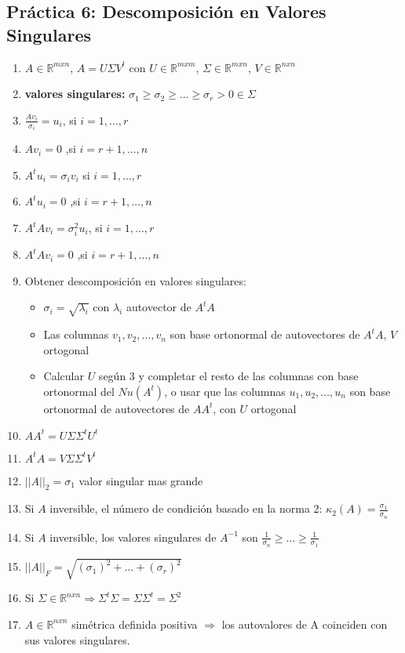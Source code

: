 \subsection*{Práctica 6: Descomposición en Valores Singulares}
\begin{enumerate}
    \item $A \in \mathbb{R}^{mxn}$, $A=U\Sigma V^t$ con  $U \in \mathbb{R}^{mxm}$, $\Sigma \in \mathbb{R}^{mxn}$, $V\in \mathbb{R}^{nxn}$
    \item \textbf{valores singulares: }$\sigma_1 \geq \sigma_2 \geq \dots \geq \sigma_r > 0 \in \Sigma$
    \item $\frac{Av_i}{\sigma_i} = u_i$, si $i = 1, \dots, r$
    \item $Av_i = 0$ ,si $i = r+1, \dots, n$
    \item $A^t u_i = \sigma_i v_i$ si $i = 1, \dots, r$
    \item $A^t u_i = 0 $ ,si $i = r+1, \dots, n$
    \item $A^tAv_i = \sigma_i^2 u_i$, si $i = 1, \dots, r$
    \item $A^tAv_i = 0$ ,si $i = r+1, \dots, n$
    \item Obtener descomposición en valores singulares:
    \begin{itemize}
        \item $\sigma_i = \sqrt{\lambda_i}$ con $\lambda_i$ autovector de $A^tA$ 
        \item Las columnas $v_1, v_2, \dots, v_n$ son base ortonormal de autovectores de $A^tA$, $V$ ortogonal
        \item Calcular $U$ según 3 y completar el resto de las columnas con base ortonormal del $Nu(A^t)$, o usar que las columnas $u_1, u_2, \dots, u_n$ son base ortonormal de autovectores de $AA^t$, con $U$ ortogonal
    \end{itemize}
    \item $AA^t = U \Sigma \Sigma^t U^t$
    \item $A^tA = V \Sigma \Sigma^t V^t$
    \item $||A||_2 = \sigma_1$ valor singular mas grande
    \item Si $A$ inversible, el número de condición basado en la norma 2: $\kappa_2(A) = \frac{\sigma_1}{\sigma_n}$
    \item Si $A$ inversible, los valores singulares de $A^{-1}$ son $\frac{1}{\sigma_n} \geq \dots \geq \frac{1}{\sigma_1} $
    \item $||A||_F = \sqrt{(\sigma_1)^2 + \dots + (\sigma_r)^2}$
    \item Si $\Sigma \in \mathbb{R}^{nxn} \Rightarrow \Sigma^t \Sigma = \Sigma \Sigma^t = \Sigma^2$ 
    \item $A \in \mathbb{R}^{nxn}$ simétrica definida positiva $\Rightarrow$ los autovalores de A coinciden con sus valores singulares. 
\end{enumerate}

